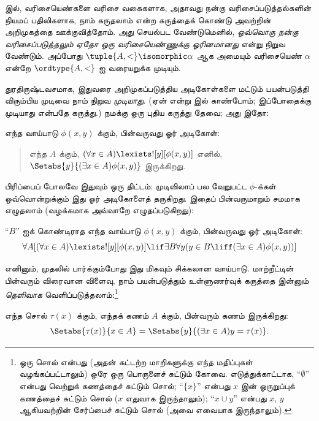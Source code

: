 \documentclass[../../../include/open-logic-section]{subfiles}
\begin{document}

 இல், வரிசையெண்களை வரிசை வகைகளாக,
அதாவது நன்கு வரிசைப்படுத்தல்களின் நியமப் பதிலிகளாக, நாம் கருதலாம் என்ற
கருத்தைக் கொண்டு அவற்றின் அறிமுகத்தை ஊக்குவித்தோம். அது செயல்பட வேண்டுமெனில்,
\emph{ஒவ்வொரு நன்கு வரிசைப்படுத்தலும் ஏதோ ஒரு வரிசையெண்ணுக்கு ஓரினமானது}
என்று நிறுவ வேண்டும். அப்போது $\tuple{A, <} \isomorphic \alpha$ ஆக
அமையும் வரிசையெண் $\alpha$ என்றே $\ordtype{A, <}$ ஐ வரையறுக்க முடியும்.

துரதிருஷ்டவசமாக, இதுவரை அறிமுகப்படுத்திய அடிகோள்களை மட்டும் பயன்படுத்தி
விரும்பிய முடிவை நாம் நிறுவ \emph{முடியாது}. (ஏன் என்று
 இல் காண்போம்; இப்போதைக்கு முடியாது
என்பதே கருத்து.) நமக்கு ஒரு புதிய கருத்து தேவை; அது இதோ:

\begin{axiom}[மாற்றீட்டு அடிகோள் திட்டம்]
எந்த வாய்பாடு $\phi(x, y)$ க்கும், பின்வருவது ஓர் அடிகோள்:
\begin{quote}
	எந்த $A$ க்கும், $(\forall x \in A)\lexists![y][\phi(x,y)]$ எனில்,
	$\Setabs{y}{(\exists x \in A)\phi(x,y)}$ இருக்கிறது.
\end{quote}
\end{axiom}
\noindent
பிரிப்பைப் போலவே இதுவும் ஒரு திட்டம்: முடிவிலாப் பல வேறுபட்ட
$\phi$-க்கள் ஒவ்வொன்றுக்கும் இது ஓர் அடிகோளைத் தருகிறது. இதைப் பின்வருமாறும்
சமமாக எழுதலாம் (வழக்கமாக அவ்வாறே எழுதப்படுகிறது):

\begin{defish}
``$B$'' ஐக் கொண்டிராத எந்த வாய்பாடு $\phi(x,y)$ க்கும், பின்வருவது ஓர்
அடிகோள்:
\[
\forall A[(\forall x \in A)\lexists![y][\phi(x,y)] \lif \exists B\forall y (y \in B \liff (\exists x \in A)\phi(x,y))]
\]
\end{defish}

எனினும், முதலில் பார்க்கும்போது இது மிகவும் சிக்கலான வாய்பாடு. மாற்றீட்டின்
பின்வரும் விரைவான விளைவு, நாம் பயன்படுத்தும் உள்ளுணர்வுக் கருத்தை இன்னும்
\emph{தெளிவாக} வெளிப்படுத்தலாம்:\footnote{ஒரு சொல் என்பது (அதன் கட்டற்ற
மாறிகளுக்கு எந்த மதிப்புகள் வழங்கப்பட்டாலும்) ஒரே ஒரு பொருளைச்
சுட்டும் கோவை. எடுத்துக்காட்டாக, ``$\emptyset$'' என்பது வெற்றுக் கணத்தைச்
சுட்டும் சொல்; ``$\{x\}$'' என்பது $x$ இன் ஓருறுப்புக் கணத்தைச் சுட்டும்
சொல் ($x$ எதுவாக இருந்தாலும்); ``$x \cup y$'' என்பது $x$, $y$ ஆகியவற்றின்
சேர்ப்பைச் சுட்டும் சொல் (அவை எவையாக இருந்தாலும்).}

\begin{cor}
எந்த சொல் $\tau(x)$ க்கும், எந்தக் கணம் $A$ க்கும், பின்வரும் கணம்
இருக்கிறது:
\[
	\Setabs{\tau(x)}{x \in A} = \Setabs{y}{(\exists x \in A)y = \tau(x)}.
\]
\end{cor}
\end{document}
